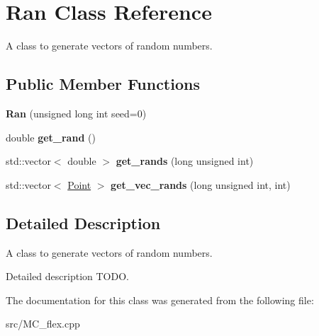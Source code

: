 \hypertarget{class_ran}{}\section{Ran Class Reference}
\label{class_ran}


A class to generate vectors of random numbers.  


\subsection*{Public Member Functions}
\begin{DoxyCompactItemize}
\item 
\mbox{\label{class_ran_af481229a857d69a9520b3eb3007a471b}} 
{\bfseries Ran} (unsigned long int seed=0)
\item 
\mbox{\label{class_ran_a28a4a034864260c947aa5b8eb7d32a0d}} 
double {\bfseries get\+\_\+rand} ()
\item 
\mbox{\label{class_ran_a75d4f1bfd76c33977b78c5f51973df1b}} 
std\+::vector$<$ double $>$ {\bfseries get\+\_\+rands} (long unsigned int)
\item 
\mbox{\label{class_ran_aa392309234eac7fd4491b6ef5e7e7fe6}} 
std\+::vector$<$ \hyperlink{class_point}{Point} $>$ {\bfseries get\+\_\+vec\+\_\+rands} (long unsigned int, int)
\end{DoxyCompactItemize}


\subsection{Detailed Description}
A class to generate vectors of random numbers. 

Detailed description T\+O\+DO. 

The documentation for this class was generated from the following file\+:\begin{DoxyCompactItemize}
\item 
src/M\+C\+\_\+flex.\+cpp\end{DoxyCompactItemize}
